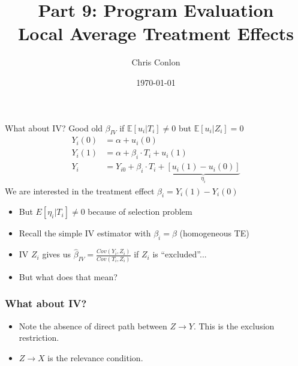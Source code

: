 \documentclass[xcolor=pdftex,dvipsnames,table,mathserif,aspectratio=169]{beamer}
\begin{document}
\title{Part 9: Program Evaluation\\
Local Average Treatment Effects}
\author{Chris Conlon}
\date{\today}

\frame{\titlepage}



\begin{frame}{What about IV?}
Good old $\beta_{IV}$ if $\mathbb{E}[u_i | T_i] \neq 0$ but $\mathbb{E}[u_i | Z_i] = 0$
\begin{align*}
Y_i(0) &= \alpha + u_i(0)\\
Y_i(1) &= \alpha + \beta_i\cdot T_i +  u_i(1)\\
Y_i &= Y_{i0} + \beta_i \cdot T_i  + \underbrace{[u_i(1) - u_i(0)]}_{\eta_i}
\end{align*}
We are interested in the \alert{treatment effect} $\beta_i = Y_i(1) - Y_i(0)$
\begin{itemize}
\item But $E[\eta_i |  T_i] \neq 0$ because of \alert{selection problem}
\item Recall the simple IV estimator with $\beta_i = \beta$ (homogeneous TE)
\item IV $Z_i$ gives us $\widehat{\beta}_{IV}= \frac{Cov(Y_i,Z_i)}{Cov(T_i,Z_i)}$ if $Z_i$ is ``excluded''...
\item But what does that mean?
\end{itemize}
\end{frame}

\begin{frame}
\frametitle{What about IV?}
\begin{itemize}
\item Note the absence of direct path between $Z \rightarrow Y$. This is the \alert{exclusion restriction}.
\item $Z \rightarrow X$ is the \alert{relevance} condition.
\end{itemize}
\vspace{0.5cm}
\begin{center}
\end{center}

\end{frame}
\end{document}
